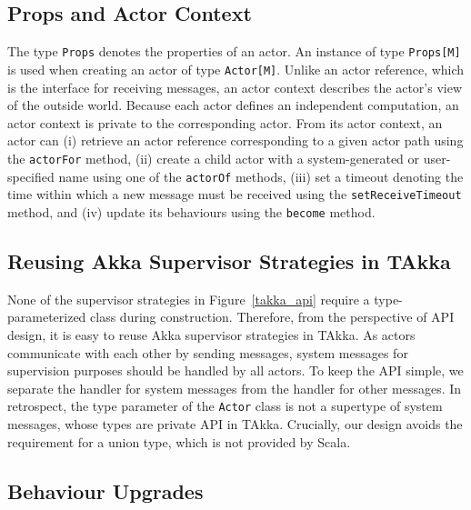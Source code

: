 \subsection{Props and Actor Context}
\label{actor_context}
The type {\tt Props} denotes the properties of an actor.   An instance  of type 
{\tt Props[M]} is used when creating an actor of type {\tt Actor[M]}.  
Unlike an actor reference, which is the interface for receiving messages, 
an actor context describes the actor's view of the outside world.   Because 
each actor defines an independent computation, an actor context is private to 
the corresponding actor.  From its 
actor context, an actor can (i) retrieve an actor reference 
corresponding to a given actor path using the {\tt actorFor} method, (ii) 
create a child actor with a system-generated or user-specified name using one 
of the {\tt actorOf} methods, (iii) set a timeout denoting the time within which
a new message must be received using the {\tt setReceiveTimeout} method, and
(iv) update its behaviours using the {\tt become} method.  







\subsection{Reusing Akka Supervisor Strategies in TAkka}
\label{supervision}

None of the supervisor strategies in Figure~\ref{takka_api} require a 
type-parameterized class during construction.  Therefore, from the perspective 
of API design, it is easy to reuse Akka supervisor strategies in TAkka.  
As actors communicate with each other by sending messages, system messages for 
supervision purposes should be handled by all  actors.  
To keep the API simple, we separate the handler for system messages from the
handler for other messages.  In retrospect, the type parameter of the {\tt Actor}
class is not a supertype of system messages, whose types are private 
API in TAkka.  Crucially, our design avoids the requirement for a union type, 
which is not provided by Scala.


\subsection{Behaviour Upgrades}

